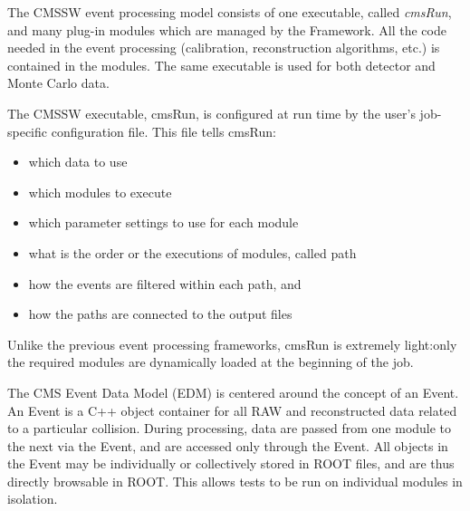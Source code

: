 The CMSSW event processing model consists of one executable, called \textit{cmsRun}, and many plug-in modules which are managed by the Framework. All the code needed in the event processing (calibration, reconstruction algorithms, etc.) is contained in the modules. The same executable is used for both detector and Monte Carlo data.

The CMSSW executable, cmsRun, is configured at run time by the user's job-specific configuration file. This file tells cmsRun:

\begin{itemize}
\item 
which data to use
\item 
which modules to execute
\item
which parameter settings to use for each module
\item
what is the order or the executions of modules, called path
\item
how the events are filtered within each path, and
\item
how the paths are connected to the output files 
\end{itemize}

Unlike the previous event processing frameworks, cmsRun is extremely light:only the required modules are dynamically loaded at the beginning of the job.

The CMS Event Data Model (EDM) is centered around the concept of an Event. An Event is a C++ object container for all RAW and reconstructed data related to a particular collision. During processing, data are passed from one module to the next via the Event, and are accessed only through the Event. All objects in the Event may be individually or collectively stored in ROOT files, and are thus directly browsable in ROOT. This allows tests to be run on individual modules in isolation. 
